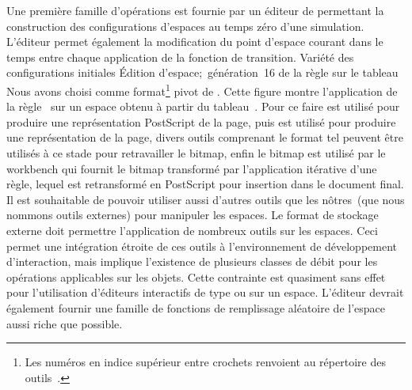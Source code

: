 Une première famille d'opérations est fournie par un éditeur de
permettant la construction des configurations d'espaces
au temps zéro d'une simulation. %
L'éditeur permet également la modification du point d'espace courant
dans le temps entre chaque application de la fonction de transition.
%
{Variété des configurations initiales}%
{Édition d'espace;~génération~16 de la règle  sur le
  tableau~}%
{Nous avons choisi  comme format\footnote{%
    Les numéros en indice supérieur entre crochets renvoient au
    répertoire des outils~.} %
  pivot de . %
  Cette figure montre l'application de la règle~ sur
  un espace obtenu à partir du tableau~. %
  Pour ce faire  est utilisé pour produire une
  représentation PostScript de la page, puis 
  est utilisé pour produire une représentation  de la page,
  divers outils comprenant le format  tel 
  peuvent être utilisés à ce stade pour retravailler le bitmap, enfin
  le bitmap est utilisé par le workbench qui fournit le bitmap
  transformé par l'application itérative d'une règle, lequel est
  retransformé en PostScript pour insertion dans le document final.}
Il est souhaitable de pouvoir utiliser aussi d'autres outils que les
nôtres~(que nous nommons outils externes) pour manipuler les espaces. %
Le format de stockage externe doit permettre l'application
 de nombreux outils
sur les espaces. %
Ceci permet une intégration étroite de ces outils à l'environnement de
développement  d'interaction, mais implique l'existence de
plusieurs classes de débit pour les opérations applicables sur les
objets. %
Cette contrainte est quasiment sans effet pour l'utilisation
d'éditeurs interactifs de type  %
ou  %
sur un espace.
L'éditeur devrait également fournir une famille de fonctions de
remplissage aléatoire de l'espace aussi riche que possible.

